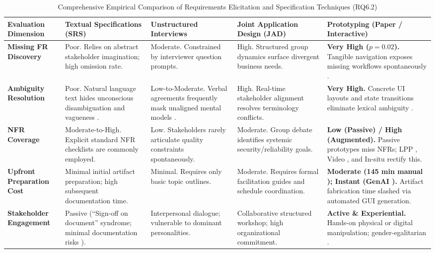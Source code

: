 \begin{table}[t]
\centering
\caption{Comprehensive Empirical Comparison of Requirements Elicitation and Specification Techniques (RQ6.2)}
\label{tab:comparative_matrix}
\begin{tabularx}{\textwidth}{>{\hsize=0.80\hsize\raggedright\arraybackslash}X >{\hsize=1.05\hsize\raggedright\arraybackslash}X >{\hsize=1.05\hsize\raggedright\arraybackslash}X >{\hsize=1.05\hsize\raggedright\arraybackslash}X >{\hsize=1.05\hsize\raggedright\arraybackslash}X}
\toprule
\textbf{Evaluation Dimension} & \textbf{Textual Specifications (SRS)} & \textbf{Unstructured Interviews} & \textbf{Joint Application Design (JAD)} & \textbf{Prototyping (Paper / Interactive)} \\
\midrule
\textbf{Missing FR Discovery} & Poor. Relies on abstract stakeholder imagination; high omission rate. & Moderate. Constrained by interviewer question prompts. & High. Structured group dynamics surface divergent business needs. & \textbf{Very High ($p = 0.02$).} Tangible navigation exposes missing workflows spontaneously \cite{rueda2020requirements}. \\
\addlinespace
\textbf{Ambiguity Resolution} & Poor. Natural language text hides unconscious disambiguation \cite{berry2003contract} and vagueness \cite{cascon2025ambiguity}. & Low-to-Moderate. Verbal agreements frequently mask unaligned mental models \cite{ferrari2016ambiguity}. & High. Real-time stakeholder alignment resolves terminology conflicts. & \textbf{Very High.} Concrete UI layouts and state transitions eliminate lexical ambiguity \cite{cascon2025ambiguity, kolthoff2024interlinking}. \\
\addlinespace
\textbf{NFR Coverage} & Moderate-to-High. Explicit standard NFR checklists are commonly employed. & Low. Stakeholders rarely articulate quality constraints spontaneously. & Moderate. Group debate identifies systemic security/reliability goals. & \textbf{Low (Passive) / High (Augmented).} Passive prototypes miss NFRs; LPP \cite{abad2018loud}, Video \cite{bano2023videos}, and In-situ \cite{hoffmann2011automotive} rectify this. \\
\addlinespace
\textbf{Upfront Preparation Cost} & Minimal initial artifact preparation; high subsequent documentation time. & Minimal. Requires only basic topic outlines. & Moderate. Requires formal facilitation guides and schedule coordination. & \textbf{Moderate (145 min manual \cite{rueda2020requirements}); Instant (GenAI \cite{wei2023boosting}).} Artifact fabrication time slashed via automated GUI generation. \\
\addlinespace
\textbf{Stakeholder Engagement} & Passive (``Sign-off on document'' syndrome; minimal documentation risks \cite{inayat2015systematic}). & Interpersonal dialogue; vulnerable to dominant personalities. & Collaborative structured workshop; high organizational commitment. & \textbf{Active \& Experiential.} Hands-on physical or digital manipulation; gender-egalitarian \cite{diaz2021gender}. \\
\bottomrule
\end{tabularx}
\end{table}

